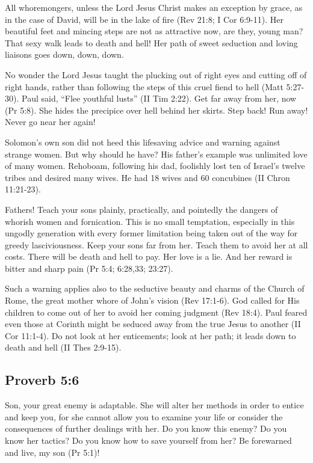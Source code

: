 All whoremongers, unless the Lord Jesus Christ makes an exception by grace, as in the case of David, will be in the lake of fire (Rev 21:8; I Cor 6:9-11). Her beautiful feet and mincing steps are not as attractive now, are they, young man? That sexy walk leads to death and hell! Her path of sweet seduction and loving liaisons goes down, down, down.

No wonder the Lord Jesus taught the plucking out of right eyes and cutting off of right hands, rather than following the steps of this cruel fiend to hell (Matt 5:27-30). Paul said, “Flee youthful lusts” (II Tim 2:22). Get far away from her, now (Pr 5:8). She hides the precipice over hell behind her skirts. Step back! Run away! Never go near her again!

Solomon’s own son did not heed this lifesaving advice and warning against strange women. But why should he have? His father’s example was unlimited love of many women. Rehoboam, following his dad, foolishly lost ten of Israel’s twelve tribes and desired many wives. He had 18 wives and 60 concubines (II Chron 11:21-23).

Fathers! Teach your sons plainly, practically, and pointedly the dangers of whorish women and fornication. This is no small temptation, especially in this ungodly generation with every former limitation being taken out of the way for greedy lasciviousness. Keep your sons far from her. Teach them to avoid her at all costs. There will be death and hell to pay. Her love is a lie. And her reward is bitter and sharp pain (Pr 5:4; 6:28,33; 23:27).

Such a warning applies also to the seductive beauty and charms of the Church of Rome, the great mother whore of John’s vision (Rev 17:1-6). God called for His children to come out of her to avoid her coming judgment (Rev 18:4). Paul feared even those at Corinth might be seduced away from the true Jesus to another (II Cor 11:1-4). Do not look at her enticements; look at her path; it leads down to death and hell (II Thes 2:9-15).

\subsection{Proverb 5:6}
Son, your great enemy is adaptable. She will alter her methods in order to entice and keep you, for she cannot allow you to examine your life or consider the consequences of further dealings with her. Do you know this enemy? Do you know her tactics? Do you know how to save yourself from her? Be forewarned and live, my son (Pr 5:1)!

